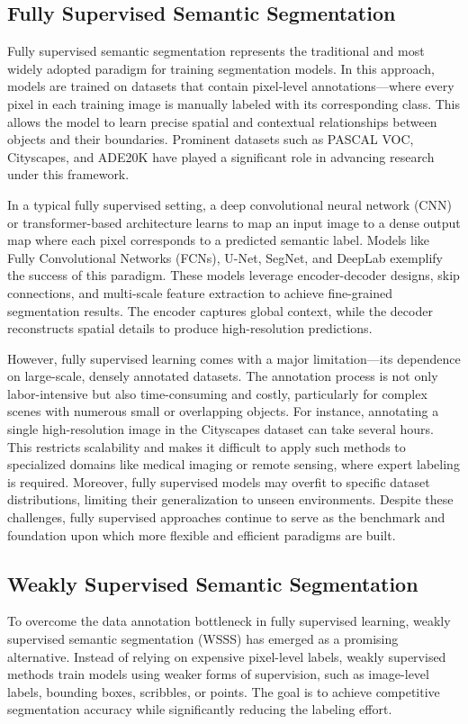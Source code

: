 \subsection{Fully Supervised Semantic Segmentation}
\label{subsec:fully_supervised}
Fully supervised semantic segmentation represents the traditional and most widely adopted paradigm for training segmentation models. In this approach, models are trained on datasets that contain pixel-level annotations—where every pixel in each training image is manually labeled with its corresponding class. This allows the model to learn precise spatial and contextual relationships between objects and their boundaries. Prominent datasets such as PASCAL VOC, Cityscapes, and ADE20K have played a significant role in advancing research under this framework.

In a typical fully supervised setting, a deep convolutional neural network (CNN) or transformer-based architecture learns to map an input image to a dense output map where each pixel corresponds to a predicted semantic label. Models like Fully Convolutional Networks (FCNs), U-Net, SegNet, and DeepLab exemplify the success of this paradigm. These models leverage encoder-decoder designs, skip connections, and multi-scale feature extraction to achieve fine-grained segmentation results. The encoder captures global context, while the decoder reconstructs spatial details to produce high-resolution predictions.

However, fully supervised learning comes with a major limitation—its dependence on large-scale, densely annotated datasets. The annotation process is not only labor-intensive but also time-consuming and costly, particularly for complex scenes with numerous small or overlapping objects. For instance, annotating a single high-resolution image in the Cityscapes dataset can take several hours. This restricts scalability and makes it difficult to apply such methods to specialized domains like medical imaging or remote sensing, where expert labeling is required. Moreover, fully supervised models may overfit to specific dataset distributions, limiting their generalization to unseen environments. Despite these challenges, fully supervised approaches continue to serve as the benchmark and foundation upon which more flexible and efficient paradigms are built.

\subsection{Weakly Supervised Semantic Segmentation}
\label{subsec:weakly_supervised}
To overcome the data annotation bottleneck in fully supervised learning, weakly supervised semantic segmentation (WSSS) has emerged as a promising alternative. Instead of relying on expensive pixel-level labels, weakly supervised methods train models using weaker forms of supervision, such as image-level labels, bounding boxes, scribbles, or points. The goal is to achieve competitive segmentation accuracy while significantly reducing the labeling effort.

